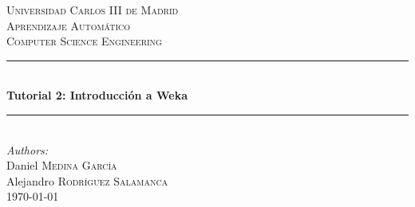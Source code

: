 \documentclass[12pt]{article}
\begin{document}
\begin{titlepage}

\newcommand{\HRule}{\rule{\linewidth}{0.5mm}} %

\center %


\textsc{\LARGE Universidad Carlos III de Madrid}\\[1.5cm] %
\textsc{\Large Aprendizaje Automático}\\[0.5cm] %
\textsc{\large Computer Science Engineering}\\[0.5cm] %


\HRule \\[0.4cm]
{ \huge \bfseries Tutorial 2: Introducción a Weka}\\[0.4cm] %
\HRule \\[1.5cm]


\emph{Authors:}\\
Daniel \textsc{Medina Garcí­a}\\ %
Alejandro \textsc{Rodrí­guez Salamanca}\\[3cm] %


{\large \today}\\[3cm] %




\vfill %

\end{titlepage}
\end{document}
